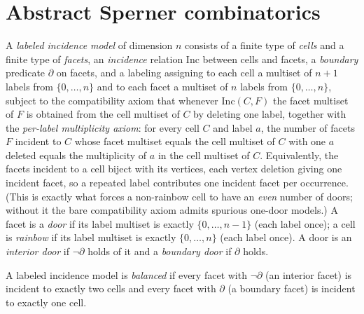 \section{Abstract Sperner combinatorics}


\begin{definition}
    \label{def:incidence-model}
    \leanok
    A \emph{labeled incidence model} of dimension $n$ consists of a finite type
    of \emph{cells} and a finite type of \emph{facets}, an \emph{incidence}
    relation $\mathrm{Inc}$ between cells and facets, a \emph{boundary} predicate
    $\partial$ on facets, and a labeling assigning to each cell a multiset of
    $n+1$ labels from $\{0, \dots, n\}$ and to each facet a multiset of $n$
    labels from $\{0, \dots, n\}$, subject to the compatibility axiom that
    whenever $\mathrm{Inc}(C, F)$ the facet multiset of $F$ is obtained from the
    cell multiset of $C$ by deleting one label, together with the
    \emph{per-label multiplicity axiom}: for every cell $C$ and label $a$, the
    number of facets $F$ incident to $C$ whose facet multiset equals the cell
    multiset of $C$ with one $a$ deleted equals the multiplicity of $a$ in the cell
    multiset of $C$. Equivalently, the facets incident to a cell biject with its
    vertices, each vertex deletion giving one incident facet, so a repeated label
    contributes one incident facet per occurrence. (This is exactly what forces a
    non-rainbow cell to have an \emph{even} number of doors; without it the bare
    compatibility axiom admits spurious one-door models.)
    A facet is a \emph{door} if its
    label multiset is exactly $\{0, \dots, n-1\}$ (each label once); a cell is
    \emph{rainbow} if its label multiset is exactly $\{0, \dots, n\}$ (each label
    once). A door is an \emph{interior door} if $\neg\partial$ holds of it and a
    \emph{boundary door} if $\partial$ holds.
\end{definition}

\begin{definition}
    \label{def:balanced-model}
    \leanok
    A labeled incidence model is \emph{balanced} if every facet with
    $\neg\partial$ (an interior facet) is incident to exactly two cells and every
    facet with $\partial$ (a boundary facet) is incident to exactly one cell.
\end{definition}


